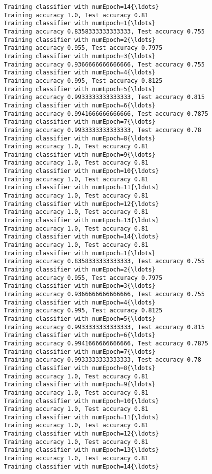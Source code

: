 \documentclass[11pt]{article}
\begin{document}
\begin{Verbatim}[commandchars=\\\{\}]
Training classifier with numEpoch=14{\ldots}
Training accuracy 1.0, Test accuracy 0.81
Training classifier with numEpoch=1{\ldots}
Training accuracy 0.8358333333333333, Test accuracy 0.755
Training classifier with numEpoch=2{\ldots}
Training accuracy 0.955, Test accuracy 0.7975
Training classifier with numEpoch=3{\ldots}
Training accuracy 0.9366666666666666, Test accuracy 0.755
Training classifier with numEpoch=4{\ldots}
Training accuracy 0.995, Test accuracy 0.8125
Training classifier with numEpoch=5{\ldots}
Training accuracy 0.9933333333333333, Test accuracy 0.815
Training classifier with numEpoch=6{\ldots}
Training accuracy 0.9941666666666666, Test accuracy 0.7875
Training classifier with numEpoch=7{\ldots}
Training accuracy 0.9933333333333333, Test accuracy 0.78
Training classifier with numEpoch=8{\ldots}
Training accuracy 1.0, Test accuracy 0.81
Training classifier with numEpoch=9{\ldots}
Training accuracy 1.0, Test accuracy 0.81
Training classifier with numEpoch=10{\ldots}
Training accuracy 1.0, Test accuracy 0.81
Training classifier with numEpoch=11{\ldots}
Training accuracy 1.0, Test accuracy 0.81
Training classifier with numEpoch=12{\ldots}
Training accuracy 1.0, Test accuracy 0.81
Training classifier with numEpoch=13{\ldots}
Training accuracy 1.0, Test accuracy 0.81
Training classifier with numEpoch=14{\ldots}
Training accuracy 1.0, Test accuracy 0.81
Training classifier with numEpoch=1{\ldots}
Training accuracy 0.8358333333333333, Test accuracy 0.755
Training classifier with numEpoch=2{\ldots}
Training accuracy 0.955, Test accuracy 0.7975
Training classifier with numEpoch=3{\ldots}
Training accuracy 0.9366666666666666, Test accuracy 0.755
Training classifier with numEpoch=4{\ldots}
Training accuracy 0.995, Test accuracy 0.8125
Training classifier with numEpoch=5{\ldots}
Training accuracy 0.9933333333333333, Test accuracy 0.815
Training classifier with numEpoch=6{\ldots}
Training accuracy 0.9941666666666666, Test accuracy 0.7875
Training classifier with numEpoch=7{\ldots}
Training accuracy 0.9933333333333333, Test accuracy 0.78
Training classifier with numEpoch=8{\ldots}
Training accuracy 1.0, Test accuracy 0.81
Training classifier with numEpoch=9{\ldots}
Training accuracy 1.0, Test accuracy 0.81
Training classifier with numEpoch=10{\ldots}
Training accuracy 1.0, Test accuracy 0.81
Training classifier with numEpoch=11{\ldots}
Training accuracy 1.0, Test accuracy 0.81
Training classifier with numEpoch=12{\ldots}
Training accuracy 1.0, Test accuracy 0.81
Training classifier with numEpoch=13{\ldots}
Training accuracy 1.0, Test accuracy 0.81
Training classifier with numEpoch=14{\ldots}

\end{Verbatim}
\end{document}
